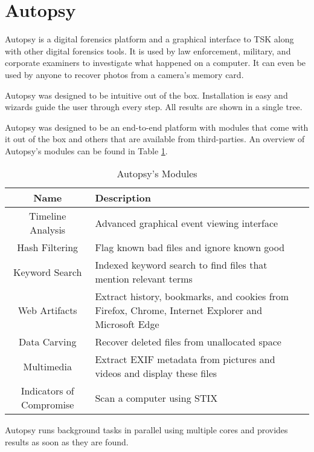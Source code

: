 \section{Autopsy}

Autopsy is a digital forensics platform and a graphical interface to TSK
along with other digital forensics tools. It is used by law enforcement, military, 
and corporate examiners to investigate what happened on a computer. It can even 
be used by anyone to recover photos from a camera's memory card.

Autopsy was designed to be intuitive out of the box. Installation is easy and
wizards guide the user through every step. All results are shown in a single tree.

Autopsy was designed to be an end-to-end platform with modules that come with
it out of the box and others that are available from third-parties. An overview of Autopsy's modules can be found in Table \ref{tab:autopsyModules}.

\begin{table}[ht]
  \begin{tabularx}{\textwidth}{@{}|c| *1{>{\centering\arraybackslash}X}@{}|}
    \hline
    \textbf{Name} & \textbf{Description} \\
    \hline\hline
    Timeline Analysis & Advanced graphical event viewing interface \\
    \hline
    Hash Filtering & Flag known bad files and ignore known good \\
    \hline
    Keyword Search & Indexed keyword search to find files that mention relevant terms \\
    \hline
    Web Artifacts & Extract history, bookmarks, and cookies from Firefox, Chrome, Internet Explorer and Microsoft Edge \\
    \hline
    Data Carving & Recover deleted files from unallocated space \\
    \hline
    Multimedia & Extract EXIF metadata from pictures and videos and display these files \\
    \hline
    Indicators of Compromise & Scan a computer using STIX \\
    \hline
  \end{tabularx}
    \caption{Autopsy's Modules}
  \label{tab:autopsyModules}
\end{table}

Autopsy runs background tasks in parallel using multiple cores and provides results as soon as they are found.

